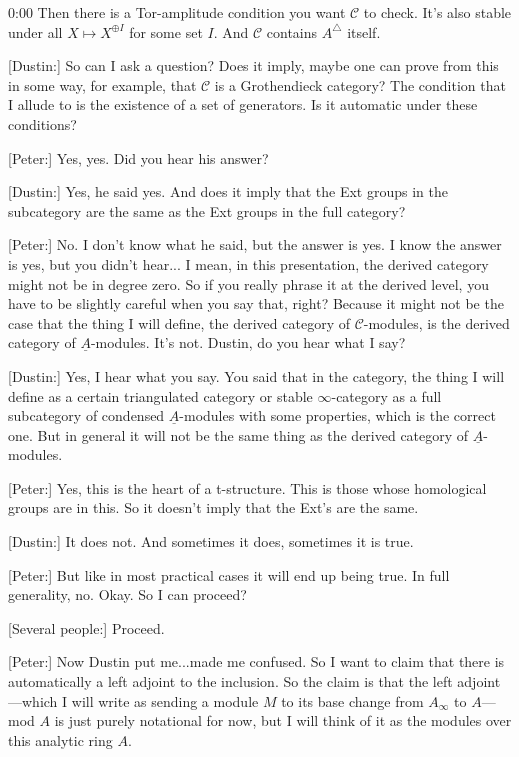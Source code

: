 \begin{unfinished}{0:00}
Then there is a Tor-amplitude condition you want $\mathcal{C}$ to check. It's also stable under all $X \mapsto X^{\oplus I}$ for some set $I$. And $\mathcal{C}$ contains $A^\triangle$ itself.

[Dustin:] So can I ask a question? Does it imply, maybe one can prove from this in some way, for example, that $\mathcal{C}$ is a Grothendieck category? The condition that I allude to is the existence of a set of generators. Is it automatic under these conditions?

[Peter:] Yes, yes. Did you hear his answer?

[Dustin:] Yes, he said yes. And does it imply that the Ext groups in the subcategory are the same as the Ext groups in the full category?

[Peter:] No. I don't know what he said, but the answer is yes. I know the answer is yes, but you didn't hear... I mean, in this presentation, the derived category might not be in degree zero. So if you really phrase it at the derived level, you have to be slightly careful when you say that, right? Because it might not be the case that the thing I will define, the derived category of $\mathcal{C}$-modules, is the derived category of $\underline{A}$-modules. It's not. Dustin, do you hear what I say?

[Dustin:] Yes, I hear what you say. You said that in the category, the thing I will define as a certain triangulated category or stable $\infty$-category as a full subcategory of condensed $\underline{A}$-modules with some properties, which is the correct one. But in general it will not be the same thing as the derived category of $\underline{A}$-modules.

[Peter:] Yes, this is the heart of a t-structure. This is those whose homological groups are in this. So it doesn't imply that the Ext's are the same.

[Dustin:] It does not. And sometimes it does, sometimes it is true.

[Peter:] But like in most practical cases it will end up being true. In full generality, no. Okay. So I can proceed?

[Several people:] Proceed.

[Peter:] Now Dustin put me...made me confused. So I want to claim that there is automatically a left adjoint to the inclusion.
So the claim is that the left adjoint---which I will write as sending a module $M$ to its base change from $A_\infty$ to $A$---mod $A$ is just purely notational for now, but I will think of it as the modules over this analytic ring $A$.


\end{unfinished}
